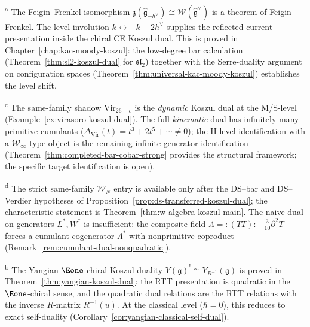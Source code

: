 \medskip
\noindent\textsuperscript{a} The Feigin--Frenkel isomorphism
$\mathfrak{z}(\hat{\mathfrak{g}}_{-h^\vee}) \cong
\mathcal{W}(\hat{\mathfrak{g}}^\vee)$ is a theorem of
Feigin--Frenkel. The level involution
$k \leftrightarrow -k-2h^\vee$ supplies the reflected current
presentation inside the chiral CE Koszul dual. This is proved in
Chapter~\ref{chap:kac-moody-koszul}: the low-degree bar
calculation
\textup{(}Theorem~\textup{\ref{thm:sl2-koszul-dual}} for
$\mathfrak{sl}_2$\textup{)} together with the Serre-duality argument on
configuration spaces
\textup{(}Theorem~\textup{\ref{thm:universal-kac-moody-koszul})}
establishes the level shift.

\noindent\textsuperscript{c} The same-family shadow
$\mathrm{Vir}_{26-c}$ is the \emph{dynamic} Koszul dual at the M/S-level
(Example~\ref{ex:virasoro-koszul-dual}). The full \emph{kinematic}
dual has infinitely many primitive cumulants
($\Delta_{\mathrm{Vir}}(t) = t^3 + 2t^5 + \cdots \neq 0$);
the H-level identification with a $\mathcal{W}_\infty$-type object
is the remaining infinite-generator identification
(Theorem~\ref{thm:completed-bar-cobar-strong} provides the structural
framework; the specific target identification is open).

\noindent\textsuperscript{d} The strict same-family
$\mathcal W_N$ entry is available only after the DS--bar and
DS--Verdier hypotheses of
Proposition~\ref{prop:ds-transferred-koszul-dual}; the characteristic
statement is Theorem~\ref{thm:w-algebra-koszul-main}. The naive dual
on generators $L^*, W^*$
is insufficient: the composite field $\Lambda = :(TT): -
\tfrac{3}{10}\partial^2 T$ forces a cumulant cogenerator $\Lambda^*$
with nonprimitive coproduct
(Remark~\ref{rem:cumulant-dual-nonquadratic}).

\noindent\textsuperscript{b} The Yangian $\Eone$-chiral Koszul duality
$Y(\mathfrak{g})^! \cong Y_{R^{-1}}(\mathfrak{g})$ is proved in
Theorem~\ref{thm:yangian-koszul-dual}: the RTT presentation is
quadratic in the $\Eone$-chiral sense, and the quadratic dual
relations are the RTT relations with the inverse $R$-matrix
$R^{-1}(u)$. At the classical level ($\hbar = 0$), this reduces to
exact self-duality
\textup{(}Corollary~\textup{\ref{cor:yangian-classical-self-dual})}.

